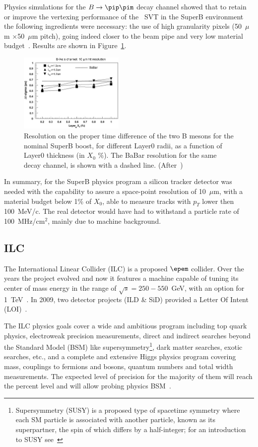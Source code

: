 Physics simulations for the $B\to\pip\pim$ decay channel showed that to retain or improve the vertexing performance of the \babar\ SVT in the SuperB environment the following ingredients were necessary: the use of high granularity pixels (50~$\mu$m $\times$50~$\mu$m pitch), going indeed closer to the beam pipe and very low material budget~\cite{RIZZO2010585}. Results are shown in 
Figure~\ref{fig:bpipi}. 

\begin{figure}
\centering
\includegraphics[width=0.45\textwidth]{bpipi}
\caption{\label{fig:bpipi} Resolution on the proper time difference of the two B mesons for the nominal SuperB boost, for different Layer0 radii, as a function of Layer0 thickness (in $X_0$ \%). The BaBar resolution for the same decay channel, is shown with a dashed line. (After~\cite{RIZZO2010585})}
\end{figure}

In summary, for the SuperB physics program a silicon tracker detector was needed with the 
capability to assure a space-point resolution of 10~$\mu$m, with a material budget below 
1\% of $X_0$, able to measure tracks with $p_T$ lower then 100~MeV/c. The real detector 
would have had to withstand a particle rate of 100~MHz/cm$^2$, mainly due to machine 
background.

\subsection{ILC}

The International Linear Collider (ILC) is a proposed $\epem$ collider. Over the years the project 
evolved and now it features a machine capable of tuning its center of mass energy in the range of 
$\sqrt{s}=250-550$~GeV, with an option for 1~TeV~\cite{ILCTDR}.  
In 2009, two detector projects (ILD \& SiD) provided a Letter Of Intent (LOI)~\cite{ILDLOI,SIDLOI}.

The ILC physics goals cover a wide and ambitious program including top quark physics, electroweak 
precision measurements, direct and indirect searches beyond the Standard Model (BSM) like 
supersymmetry\footnote{Supersymmetry (SUSY) is a proposed type of spacetime symmetry where  each 
SM particle is associated with another particle, known as its superpartner, the spin of which differs by a 
half-integer; for an introduction to SUSY see~\cite{SusyPrimer}}, 
dark matter searches, exotic searches, etc., and a complete and extensive Higgs physics program 
covering mass, couplings to fermions and bosons, quantum numbers and total width 
measurements.  The expected level of precision for the majority of them will 
reach the percent level and will allow probing physics BSM~\cite{ILCVertexing2016}.

